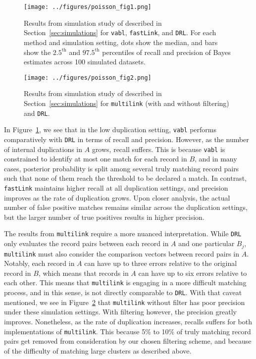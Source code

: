 \documentclass[12pt,letterpaper]{article}
\newcommand{\1}[1]{\mathbb{I}\!\left[#1\right]} %
\begin{document}
\begin{figure}[t]
	\centering
	\texttt{[image: ../figures/poisson\_fig1.png]}
	\caption{Results from simulation study of described in Section~\ref{sec:simulations} for \texttt{vabl}, \texttt{fastLink}, and \texttt{DRL}. For each method and simulation setting, dots show the median, and bars show the $2.5^{\text{th}}$ and $97.5^{\text{th}}$ percentiles of recall and precision of Bayes estimates across 100 simulated datasets.}
	\label{fig:sim-vabl-comparison}
\end{figure}

\begin{figure}
	\centering
	\texttt{[image: ../figures/poisson\_fig2.png]}
	\caption{Results from simulation study of described in Section~\ref{sec:simulations} for \texttt{multilink} (with and without filtering) and \texttt{DRL}.}
	\label{fig:sim-multilink-comparison}
\end{figure}

In Figure~\ref{fig:sim-vabl-comparison}, we see that in the low duplication setting, \texttt{vabl} performs comparatively with \texttt{DRL} in terms of recall and precision. However, as the number of internal duplications in $A$ grows, recall suffers. This is because \texttt{vabl} is constrained to identify at most one match for each record in $B$, and in many cases, posterior probability is split among several truly matching record pairs such that none of them reach the threshold to be declared a match. In contrast, \texttt{fastLink} maintains higher recall at all duplication settings, and precision improves as the rate of duplication grows. Upon closer analysis, the actual number of false positive matches remains similar across the duplication settings, but the larger number of true positives results in higher precision. 

The results from \texttt{multilink} require a more nuanced interpretation. While \texttt{DRL} only evaluates the record pairs between each record in $A$ and one particular $B_j$, \texttt{multilink} must also consider the comparison vectors between record pairs in $A$. Notably, each record in $A$ can have up to three errors relative to the original record in $B$, which means that records in $A$ can have up to six errors relative to each other. This means that \texttt{multilink} is engaging in a more difficult matching process, and in this sense, is not directly comparable to \texttt{DRL}. With that caveat mentioned, we see in Figure~\ref{fig:sim-multilink-comparison} that \texttt{multilink} without filter has poor precision under these simulation settings. With filtering however, the precision greatly improves. Nonetheless, as the rate of duplication increases, recalls suffers for both implementations of \texttt{multilink}. This because 5\% to 10\% of truly matching record pairs get removed from consideration by our chosen filtering scheme, and because of the difficulty of matching large clusters as described above.
\end{document}
